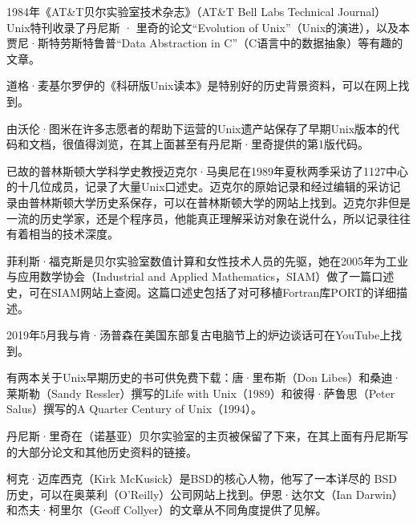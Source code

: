\documentclass[a4paper,12pt,UTF8,twoside]{ctexbook}
\begin{document}
1984年《AT\&T贝尔实验室技术杂志》（AT\&T Bell Labs Technical Journal） Unix特刊收录了丹尼斯 · 里奇的论文“Evolution of Unix”（Unix的演进），以及本贾尼·斯特劳斯特鲁普“Data Abstraction in C”（C语言中的数据抽象）等有趣的文章。

道格·麦基尔罗伊的《科研版Unix读本》是特别好的历史背景资料，可以在网上找到。

由沃伦·图米在许多志愿者的帮助下运营的Unix遗产站保存了早期Unix版本的代码和文档，很值得浏览，在其上面甚至有丹尼斯·里奇提供的第1版代码。

已故的普林斯顿大学科学史教授迈克尔·马奥尼在1989年夏秋两季采访了1127中心的十几位成员，记录了大量Unix口述史。迈克尔的原始记录和经过编辑的采访记录由普林斯顿大学历史系保存，可以在普林斯顿大学的网站上找到。迈克尔非但是一流的历史学家，还是个程序员，他能真正理解采访对象在说什么，所以记录往往有着相当的技术深度。

菲利斯·福克斯是贝尔实验室数值计算和女性技术人员的先驱，她在2005年为工业与应用数学协会（Industrial and Applied Mathematics，SIAM）做了一篇口述史，可在SIAM网站上查阅。这篇口述史包括了对可移植Fortran库PORT的详细描述。

2019年5月我与肯·汤普森在美国东部复古电脑节上的炉边谈话可在YouTube上找到。

有两本关于Unix早期历史的书可供免费下载：唐·里布斯（Don Libes）和桑迪·莱斯勒（Sandy Ressler）撰写的Life with Unix（1989）和彼得·萨鲁思（Peter Salus）撰写的A Quarter Century of Unix（1994）。

丹尼斯·里奇在（诺基亚）贝尔实验室的主页被保留了下来，在其上面有丹尼斯写的大部分论文和其他历史资料的链接。

柯克·迈库西克（Kirk McKusick）是BSD的核心人物，他写了一本详尽的 BSD 历史，可以在奥莱利（O’Reilly）公司网站上找到。伊恩·达尔文（Ian Darwin）和杰夫·柯里尔（Geoff Collyer）的文章从不同角度提供了见解。
\end{document}
